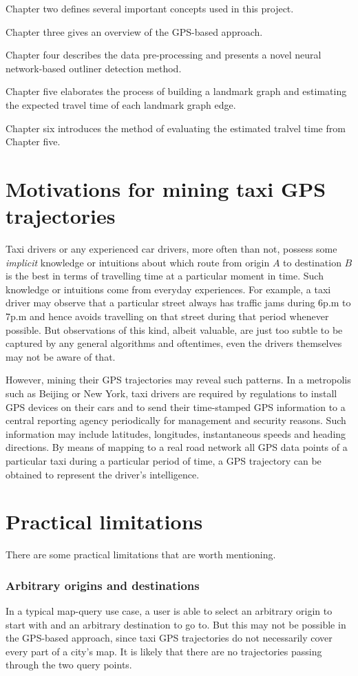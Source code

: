 Chapter two defines several important concepts used in this project. 

Chapter three gives an overview of the GPS-based approach.

Chapter four describes the data pre-processing and presents a novel neural network-based outliner detection method.

Chapter five elaborates the process of building a landmark graph and estimating the expected travel time of each landmark graph edge.

Chapter six introduces the method of evaluating the estimated tralvel time from Chapter five.

\section{Motivations for mining taxi GPS trajectories}

Taxi drivers or any experienced car drivers, more often than not, possess some \emph{implicit} knowledge or intuitions about which route from origin $A$ to destination $B$ is the best in terms of travelling time at a particular moment in time. Such knowledge or intuitions come from everyday experiences. For example, a taxi driver may observe that a particular street always has traffic jams during 6p.m to 7p.m and hence avoids travelling on that street during that period whenever possible. But observations of this kind, albeit valuable, are just too subtle to be captured by any general algorithms and oftentimes, even the drivers themselves may not be aware of that.

However, mining their GPS trajectories may reveal such patterns. In a metropolis such as Beijing or New York, taxi drivers are required by regulations to install GPS devices on their cars and to send their time-stamped GPS information to a central reporting agency periodically for management and security reasons. Such information may include latitudes, longitudes, instantaneous speeds and heading directions. By means of mapping to a real road network all GPS data points of a particular taxi during a particular period of time, a GPS trajectory can be obtained to represent the driver's intelligence. 

\section{Practical limitations}
There are some practical limitations that are worth mentioning. 
\subsubsection{Arbitrary origins and destinations}
In a typical map-query use case, a user is able to select an arbitrary origin to start with and an arbitrary destination to go to. But this may not be possible in the GPS-based approach, since taxi GPS trajectories do not necessarily cover every part of a city's map. It is likely that there are no trajectories passing through the two query points.
